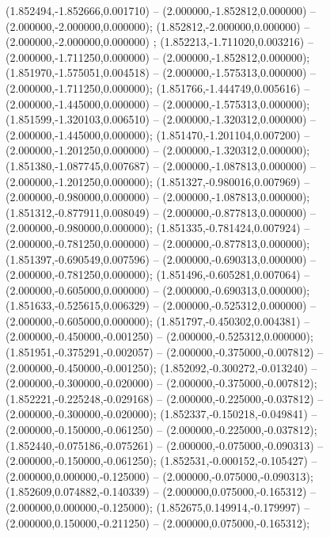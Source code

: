  (1.852494,-1.852666,0.001710) -- (2.000000,-1.852812,0.000000) -- (2.000000,-2.000000,0.000000);
 (1.852812,-2.000000,0.000000) -- (2.000000,-2.000000,0.000000) ;
 (1.852213,-1.711020,0.003216) -- (2.000000,-1.711250,0.000000) -- (2.000000,-1.852812,0.000000);
 (1.851970,-1.575051,0.004518) -- (2.000000,-1.575313,0.000000) -- (2.000000,-1.711250,0.000000);
 (1.851766,-1.444749,0.005616) -- (2.000000,-1.445000,0.000000) -- (2.000000,-1.575313,0.000000);
 (1.851599,-1.320103,0.006510) -- (2.000000,-1.320312,0.000000) -- (2.000000,-1.445000,0.000000);
 (1.851470,-1.201104,0.007200) -- (2.000000,-1.201250,0.000000) -- (2.000000,-1.320312,0.000000);
 (1.851380,-1.087745,0.007687) -- (2.000000,-1.087813,0.000000) -- (2.000000,-1.201250,0.000000);
 (1.851327,-0.980016,0.007969) -- (2.000000,-0.980000,0.000000) -- (2.000000,-1.087813,0.000000);
 (1.851312,-0.877911,0.008049) -- (2.000000,-0.877813,0.000000) -- (2.000000,-0.980000,0.000000);
 (1.851335,-0.781424,0.007924) -- (2.000000,-0.781250,0.000000) -- (2.000000,-0.877813,0.000000);
 (1.851397,-0.690549,0.007596) -- (2.000000,-0.690313,0.000000) -- (2.000000,-0.781250,0.000000);
 (1.851496,-0.605281,0.007064) -- (2.000000,-0.605000,0.000000) -- (2.000000,-0.690313,0.000000);
 (1.851633,-0.525615,0.006329) -- (2.000000,-0.525312,0.000000) -- (2.000000,-0.605000,0.000000);
 (1.851797,-0.450302,0.004381) -- (2.000000,-0.450000,-0.001250) -- (2.000000,-0.525312,0.000000);
 (1.851951,-0.375291,-0.002057) -- (2.000000,-0.375000,-0.007812) -- (2.000000,-0.450000,-0.001250);
 (1.852092,-0.300272,-0.013240) -- (2.000000,-0.300000,-0.020000) -- (2.000000,-0.375000,-0.007812);
 (1.852221,-0.225248,-0.029168) -- (2.000000,-0.225000,-0.037812) -- (2.000000,-0.300000,-0.020000);
 (1.852337,-0.150218,-0.049841) -- (2.000000,-0.150000,-0.061250) -- (2.000000,-0.225000,-0.037812);
 (1.852440,-0.075186,-0.075261) -- (2.000000,-0.075000,-0.090313) -- (2.000000,-0.150000,-0.061250);
 (1.852531,-0.000152,-0.105427) -- (2.000000,0.000000,-0.125000) -- (2.000000,-0.075000,-0.090313);
 (1.852609,0.074882,-0.140339) -- (2.000000,0.075000,-0.165312) -- (2.000000,0.000000,-0.125000);
 (1.852675,0.149914,-0.179997) -- (2.000000,0.150000,-0.211250) -- (2.000000,0.075000,-0.165312);
